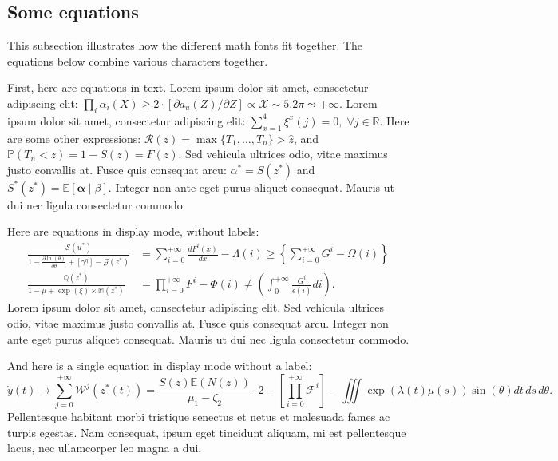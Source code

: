 \documentclass[letterpaper,11pt,leqno]{article}
\begin{document}
\subsection{Some equations} 

This subsection illustrates how the different math fonts fit together. The equations below combine various characters together.

First, here are equations in text. Lorem ipsum dolor sit amet, consectetur adipiscing elit: $\prod_i\alpha_i(X) \geq 2 \cdot [\partial a_u(Z)/\partial Z] \propto \mathcal{X} \sim 5.2\pi \leadsto +\infty$. Lorem ipsum dolor sit amet, consectetur adipiscing elit: $\sum_{x=1}^4 \xi^x(j)=0, \; \forall j\in \mathbb{R}$. Here are some other expressions: $\mathcal{R}(z) = \max\{T_1,\ldots,T_{n}\} > \hat{z}$, and  $\mathbb{P}(T_n < z) = 1 - S(z) = F(z)$.  Sed vehicula ultrices odio, vitae maximus justo convallis at. Fusce quis consequat arcu: $\alpha^* = S(z^*)$ and $S^*(z^*)=\mathbb{E}[\bm{\alpha}\mid \beta]$. Integer non ante eget purus aliquet consequat. Mauris ut dui nec ligula consectetur commodo.

Here are equations in display mode, without labels:
\begin{align*}
\frac{\mathcal{S}(u^*)}{1 - \frac{\partial \ln(\theta)}{\partial \theta} + \left[\gamma^\eta\right] - \mathcal{G}(z^*)} &= \sum_{i=0}^{+\infty}\frac{d F^{i}(x)}{d x} - \Lambda(i) \geq \left\lbrace\sum_{i=0}^{+\infty}G^{i} - \Omega(i)\right\rbrace\\
\frac{\mathbb{Q}(z^*)}{1 -\mu + \exp(\xi) \times \mathbb{M}(z^*)} &= \prod_{i=0}^{+\infty}F^{i} - \Phi(i) \neq \left(\int_{0}^{+\infty}\frac{G^{i}}{\epsilon(i)} di\right).
\end{align*}
Lorem ipsum dolor sit amet, consectetur adipiscing elit. Sed vehicula ultrices odio, vitae maximus justo convallis at. Fusce quis consequat arcu. Integer non ante eget purus aliquet consequat. Mauris ut dui nec ligula consectetur commodo.

And here is a single equation in display mode without a label:
\begin{equation*}
\dot{y}(t) \to \sum_{j=0}^{+\infty}\mathcal{W}^j(z^{\ast}(t)) = \frac{S(z) \mathbb{E}(N(z))}{\mu_1 - \zeta_2} \cdot 2 - \left[\prod_{i=0}^{+\infty}\mathcal{F}^{i}\right]-\iiint\exp(\lambda(t) \mu(s)) \sin(\theta)dt\,ds\,d\theta.
\end{equation*}
Pellentesque habitant morbi tristique senectus et netus et malesuada fames ac turpis egestas. Nam consequat, ipsum eget tincidunt aliquam, mi est pellentesque lacus, nec ullamcorper leo magna a dui.
\end{document}
